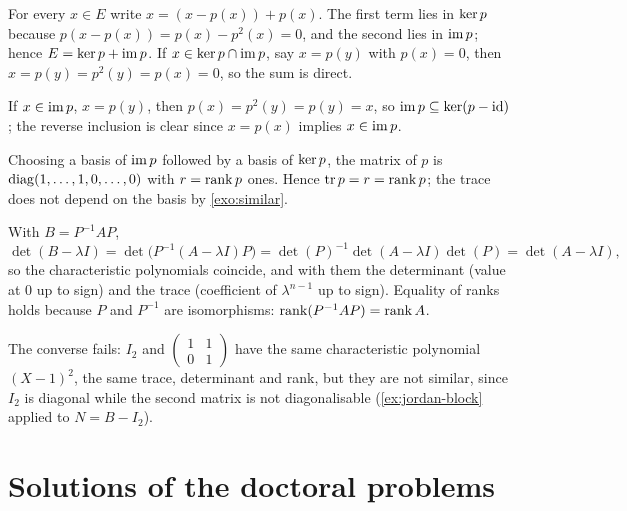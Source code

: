 \begin{solution}{}
For every $x\in E$ write $x=(x-p(x))+p(x)$. The first term lies in $\operatorname{ker} p$
because $p(x-p(x))=p(x)-p^{2}(x)=0$, and the second lies in $\operatorname{im} p$; hence
$E=\operatorname{ker} p+\operatorname{im} p$. If $x\in\operatorname{ker} p\cap\operatorname{im} p$, say $x=p(y)$ with $p(x)=0$, then
$x=p(y)=p^{2}(y)=p(x)=0$, so the sum is direct.

If $x\in\operatorname{im} p$, $x=p(y)$, then $p(x)=p^{2}(y)=p(y)=x$, so $\operatorname{im} p\subseteq\operatorname{ker}(p-\mathrm{id})$;
the reverse inclusion is clear since $x=p(x)$ implies $x\in\operatorname{im} p$.

Choosing a basis of $\operatorname{im} p$ followed by a basis of $\operatorname{ker} p$, the matrix of $p$ is
$\operatorname{diag}(1,\dots,1,0,\dots,0)$ with $r=\operatorname{rank} p$ ones. Hence $\operatorname{tr} p=r=\operatorname{rank} p$; the
trace does not depend on the basis by \cref{exo:similar}.
\end{solution}

\begin{solution}{}
With $B=P^{-1}AP$,
\[
  \det(B-\lambda I)=\det\bigl(P^{-1}(A-\lambda I)P\bigr)
  =\det(P)^{-1}\det(A-\lambda I)\det(P)=\det(A-\lambda I),
\]
so the characteristic polynomials coincide, and with them the determinant
(value at $0$ up to sign) and the trace (coefficient of $\lambda^{n-1}$ up to
sign). Equality of ranks holds because $P$ and $P^{-1}$ are isomorphisms:
$\operatorname{rank}(P^{-1}AP)=\operatorname{rank} A$.

The converse fails: $I_2$ and $\begin{pmatrix}1&1\\0&1\end{pmatrix}$ have the
same characteristic polynomial $(X-1)^{2}$, the same trace, determinant and
rank, but they are not similar, since $I_2$ is diagonal while the second matrix
is not diagonalisable (\cref{ex:jordan-block} applied to $N=B-I_2$).
\end{solution}

\section{Solutions of the doctoral problems}

